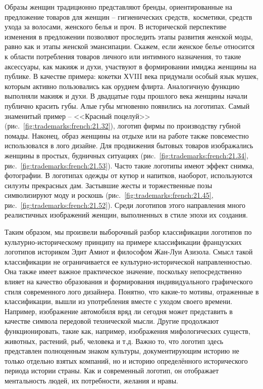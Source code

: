       Образы женщин традиционно представляют бренды, ориентированные
      на предложение товаров для женщин -- гигиенических средств,~косметики, средств
      ухода за волосами, женского белья и проч. В исторической перспективе изменения в
      предложении позволяют проследить этапы развития женской моды, равно как и этапы
      женской эмансипации. Скажем, если женское белье относится к области потребления
      товаров личного или интимного назначения, то такие аксессуары, как макияж и
      духи, участвуют в формировании имиджа женщины на публике. В качестве примера:
      кокетки ХVIII века придумали особый язык мушек, которым активно пользовались как
      орудием флирта. Аналогичную функцию выполняли макияж и духи. В двадцатые годы
      прошлого века женщины начали публично красить губы. Алые губы мгновенно
      появились на логотипах. Самый знаменитый пример -- <<Красный поцелуй>> (риc.~\ref{fig:trademarks:french:21.32}),
      логотип фирмы по производству губной помады. Наконец, образ женщины на отдыхе
      или на работе также повсеместно использовался в лого дизайне. Для продвижения
      бытовых товаров изображались женщины в простых, будничных ситуациях (риc.~\ref{fig:trademarks:french:21.34},
      риc.~\ref{fig:trademarks:french:21.53}). Часто такие логотипы имеют эффект снимка, фотографии. В логотипах одежды
      от кутюр и напитков, наоборот, используются силуэты прекрасных дам. Застывшие
      жесты и торжественные позы символизируют моду и роскошь
      (риc.~\ref{fig:trademarks:french:21.45}, риc.~\ref{fig:trademarks:french:21.52}). Среди
      логотипов этого направления много реалистичных изображений женщин, выполненных в
      стиле эпохи их создания.

Таким образом, мы произвели выборочный разбор классификации логотипов по
культурно-историческому принципу на примере классификации французских
логотипов историком Эдит Амиот и философом Жан-Луи Азизола. Смысл такой
классификации не ограничивается ее культурно-исторической направленностью.
Она также имеет важное практическое значение, поскольку непосредственно
влияет на качество образования и формирования индивидуального графического
стиля современного лого дизайнера. Понятно, что какие-то мотивы, отраженные
в классификации, вышли из употребления вместе с уходом своего времени.
Например, изображение автомобиля вряд ли сегодня может представить в качестве
символа передовой технической мысли. Другие продолжают функционировать,
такие как, например, изображения мифологических существ, животных, растений,
рыб, человека и т.д. Важно то, что логотип здесь представлен полноценным
знаком культуры, документирующим историю не только отдельно взятых компаний,
но и историю определённого исторического периода истории страны. Как и
современный логотип, он отображает ментальность людей, их потребности,
желания и нравы.

